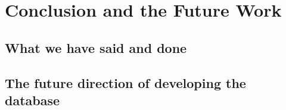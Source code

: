 \section{Conclusion and the Future Work}
\label{sec:summ}
\subsection{What we have said and done}
\subsection{The future direction of developing the database}


	